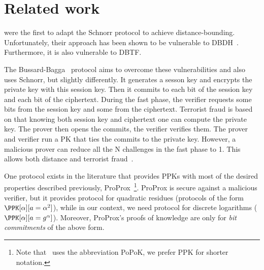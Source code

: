 \section{Related work}%
\label{related-work}

\textcite{DistanceBounding} were the first to adapt the Schnorr
protocol to achieve distance-bounding.
Unfortunately, their approach has been shown to be vulnerable to 
\ac{DBDH}~\cite{DistanceBounding,TamarinDB}.
Furthermore, it is also vulnerable to \ac{DBTF}.

The Bussard-Bagga~\cite{BussardBagga} protocol aims to overcome these
vulnerabilities and also uses Schnorr, but slightly
differently. It generates a sesson key and encrypts the private key
with this session key. Then it commits to each bit of the session key
and each bit of the ciphertext. During the fast phase, the verifier requests some bits from the session key and some from the ciphertext. Terrorist fraud is based on that knowing both session key and ciphertext one can compute the private key.
The prover then opens the commits, the verifier verifies them.
The prover and verifier run a \ac{PK} that ties the commits to the private key.
However, a malicious prover can reduce all the N challenges in the fast phase
to 1. This allows both distance and terrorist
fraud~\cite{Bussard-Bagga-attack}.

One protocol exists in the literature that provides \acp{PPK} with most of the desired properties described previously, ProProx~\cite{ProProx}\footnote{Note that~\cite{ProProx} uses the abbreviation PoPoK, we prefer \acs{PPK} for shorter notation.}.
ProProx is secure against a malicious verifier, but it provides  
protocol for quadratic residues (\ie protocols of the form \(
  \PPK[\alpha][a = \alpha^2]
\)), while in our context, we need  protocol for discrete logarithms 
(\ie \(\PPK[\alpha][a = g^\alpha]\)). %
Moreover, ProProx's proofs of knowledge are only for \emph{bit commitments} of the 
above form. %

